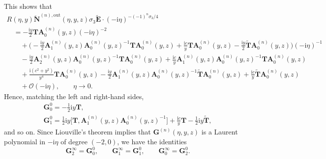 \documentclass[11pt]{article}
\numberwithin{equation}{section}
\numberwithin{equation}{section}
\begin{document}
\noindent
 This shows that
\begin{gather*}
R(\eta,y)\breve{\mathbf{N}}^{(n),\mathrm{out}}(\eta,y,z)\sigma_3\widetilde{\mathbf{E}}\cdot(-\mathrm{i}\eta)^{-(-1)^n\sigma_3/4}\\
\quad{} =-\frac{\mathrm{i} y}{2}\mathbf{T}\mathbf{A}_0^{(n)}(y,z) (-\mathrm{i}\eta)^{-2} \\
 \qquad{}+ \biggl(-\frac{\mathrm{i} y}{2} \mathbf{A}_1^{(n)}(y,z)\mathbf{A}_0^{(n)}(y,z)^{-1}\mathbf{T}\mathbf{A}_0^{(n)}(y,z)+\frac{\mathrm{i} c}{y}\mathbf{T}\mathbf{A}_0^{(n)}(y,z)-\frac{\mathrm{i} y}{2}\widetilde{\mathbf{T}}\mathbf{A}_0^{(n)}(y,z)\biggr)(-\mathrm{i}\eta)^{-1} \\
 \qquad{}-\frac{\mathrm{i} y}{2}\mathbf{A}_2^{(n)}(y,z)\mathbf{A}_0^{(n)}(y,z)^{-1}\mathbf{T}\mathbf{A}_0^{(n)}(y,z)+\frac{\mathrm{i} c}{y}\mathbf{A}_1^{(n)}(y,z)\mathbf{A}_0^{(n)}(y,z)^{-1}\mathbf{T}\mathbf{A}_0^{(n)}(y,z)\\
 \qquad{}+\frac{\mathrm{i} (c^2+y^2)}{y^4}\mathbf{T}\mathbf{A}_0^{(n)}(y,z) -\frac{\mathrm{i} y}{2}\mathbf{A}_1^{(n)}(y,z)\mathbf{A}_0^{(n)}(y,z)^{-1}\widetilde{\mathbf{T}}\mathbf{A}_0^{(n)}(y,z) +\frac{\mathrm{i} c}{y}\widetilde{\mathbf{T}}\mathbf{A}_0^{(n)}(y,z) \\
 \qquad{}+\mathcal{O}(-\mathrm{i}\eta),\qquad\eta\to 0.
\end{gather*}
Hence, matching the left and right-hand sides,
\begin{gather*}
\mathbf{G}_0^0=-\tfrac{1}{2}\mathrm{i} y\mathbf{T},
\\
\mathbf{G}_1^0=\tfrac{1}{2}\mathrm{i} y\big[\mathbf{T},\mathbf{A}_1^{(n)}(y,z)\mathbf{A}_0^{(n)}(y,z)^{-1}\big]+\frac{\mathrm{i} c}{y}\mathbf{T}-\tfrac{1}{2}\mathrm{i} y\widetilde{\mathbf{T}},
\end{gather*}
and so on. Since Liouville's theorem implies that $\mathbf{G}^{(n)}(\eta,y,z)$ is a Laurent polynomial in $-\mathrm{i}\eta$ of degree $(-2,0)$, we have the identities
\begin{equation*}
\mathbf{G}^\infty_2=\mathbf{G}_0^0,\qquad\mathbf{G}^\infty_1=\mathbf{G}_1^0,\qquad\mathbf{G}^\infty_0=\mathbf{G}_2^0.
\end{equation*}
\end{document}
